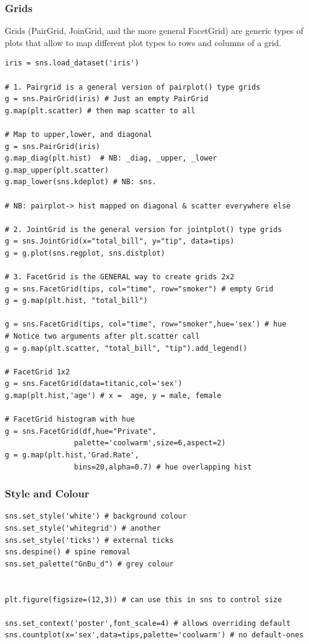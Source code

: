 \documentclass[11pt]{article}
\begin{document}
\subsubsection{Grids}
Grids (PairGrid, JoinGrid, and the more general FacetGrid) are generic types of plots that allow to map different plot types to rows and columns of a grid.
\begin{lstlisting}
iris = sns.load_dataset('iris')

# 1. Pairgrid is a general version of pairplot() type grids
g = sns.PairGrid(iris) # Just an empty PairGrid
g.map(plt.scatter) # then map scatter to all

# Map to upper,lower, and diagonal
g = sns.PairGrid(iris)
g.map_diag(plt.hist)  # NB: _diag, _upper, _lower
g.map_upper(plt.scatter)
g.map_lower(sns.kdeplot) # NB: sns. 

# NB: pairplot-> hist mapped on diagonal & scatter everywhere else

# 2. JointGrid is the general version for jointplot() type grids
g = sns.JointGrid(x="total_bill", y="tip", data=tips)
g = g.plot(sns.regplot, sns.distplot)

# 3. FacetGrid is the GENERAL way to create grids 2x2
g = sns.FacetGrid(tips, col="time", row="smoker") # empty Grid
g = g.map(plt.hist, "total_bill")

g = sns.FacetGrid(tips, col="time", row="smoker",hue='sex') # hue
# Notice two arguments after plt.scatter call
g = g.map(plt.scatter, "total_bill", "tip").add_legend()

# FacetGrid 1x2
g = sns.FacetGrid(data=titanic,col='sex')
g.map(plt.hist,'age') # x =  age, y = male, female

# FacetGrid histogram with hue
g = sns.FacetGrid(df,hue="Private",
				palette='coolwarm',size=6,aspect=2)
g = g.map(plt.hist,'Grad.Rate',
				bins=20,alpha=0.7) # hue overlapping hist
\end{lstlisting}

\subsubsection{Style and Colour}
\begin{lstlisting}
sns.set_style('white') # background colour
sns.set_style('whitegrid') # another
sns.set_style('ticks') # external ticks
sns.despine() # spine removal
sns.set_palette("GnBu_d") # grey colour


plt.figure(figsize=(12,3)) # can use this in sns to control size

sns.set_context('poster',font_scale=4) # allows overriding default
sns.countplot(x='sex',data=tips,palette='coolwarm') # no default-ones
\end{lstlisting}
\end{document}
